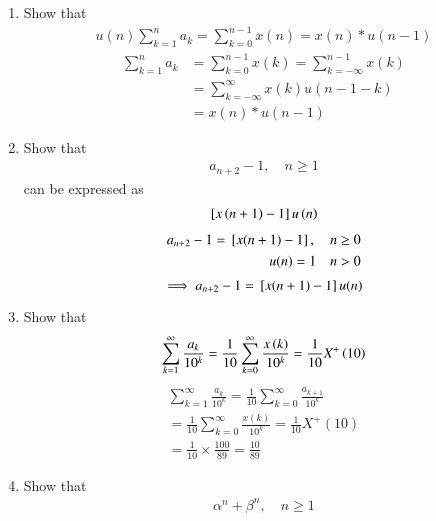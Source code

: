 \documentclass[journal,12pt,twocolumn]{IEEEtran}
\renewcommand\thesection{\arabic{section}}
\begin{document}
\begin{enumerate}[label=\thesection.\arabic*,ref=\thesection.\theenumi]
\item Show that 
\begin{align}u(n)
	\sum_{k=1}^{n}a_k = 
	\sum_{k=0}^{n-1}x(n) = x(n)*u(n-1)
\end{align}
\solution %
\begin{align}
	\sum_{k=1}^{n}a_k &= \sum_{k=0}^{n-1}x(k)= \sum_{k = -\infty}^{n - 1}x(k)\\
	&= \sum_{k = -\infty}^{\infty}x(k)u(n - 1 - k) \\
	&= x(n)*u(n - 1)
\end{align}
\item Show that 
\begin{align}
	a_{n+2}-1, \quad n \ge 1
\end{align}
can be expressed as 
\begin{align}
	{}\left[x\left(n+1\right)-1\right]u\left(n\right)
\end{align}
\solution %
\begin{align}
	a_{n+2} - 1 = {}\left[x(n + 1) - 1\right], \quad n \ge 0\\
	u(n) = 1 \quad n > 0
\end{align}
\begin{equation}
	\implies a_{n+2} - 1 = {}\left[x(n + 1) - 1\right]u(n)
	\label{eq:an2xn}
\end{equation}
\item Show that 
\begin{align}
	\sum_{k=1}^{\infty}\frac{a_k}{10^k}= 
	\frac{1}{10}\sum_{k=0}^{\infty}\frac{x\left(k\right)}{10^k} =\frac{1}{10}X^{+}\left({10}\right)
\label{eq:x+10}
\end{align}
\solution 
\begin{align}
	\sum_{k=1}^{\infty}\frac{a_k}{10^k} = \frac{1}{10}\sum_{k = 0}^{\infty}\frac{a_{k+1}}{10^k} \\
	= \frac{1}{10}\sum_{k = 0}^{\infty}\frac{x(k)}{10^k} 
	= \frac{1}{10}X^+(10) \\
	= \frac{1}{10}\times\frac{100}{89} = \frac{10}{89}
\end{align}
\item Show that 
\begin{align}
	\alpha^n + \beta^n, \quad n \ge 1

\end{align}
\end{enumerate}
\end{document}
